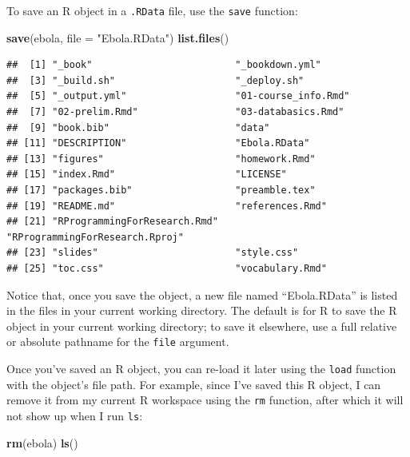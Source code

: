\documentclass[]{book}
\makeatletter
\newenvironment{Shaded}{\begin{snugshade}}{\end{snugshade}}
\newcommand{\KeywordTok}[1]{\textcolor[rgb]{0.13,0.29,0.53}{\textbf{#1}}}
\newcommand{\DataTypeTok}[1]{\textcolor[rgb]{0.13,0.29,0.53}{#1}}
\newcommand{\StringTok}[1]{\textcolor[rgb]{0.31,0.60,0.02}{#1}}
\newcommand{\NormalTok}[1]{#1}
\newenvironment{kframe}{%
\medskip{}
\setlength{\fboxsep}{.8em}
 \def\at@end@of@kframe{}%
 \ifinner\ifhmode%
  \def\at@end@of@kframe{\end{minipage}}%
  \begin{minipage}{\columnwidth}%
 \fi\fi%
 \def\FrameCommand##1{\hskip\@totalleftmargin \hskip-\fboxsep
 \colorbox{shadecolor}{##1}\hskip-\fboxsep
     \hskip-\linewidth \hskip-\@totalleftmargin \hskip\columnwidth}%
 \MakeFramed {\advance\hsize-\width
   \@totalleftmargin\z@ \linewidth\hsize
   \@setminipage}}%
 {\par\unskip\endMakeFramed%
 \at@end@of@kframe}
\renewenvironment{Shaded}{\begin{kframe}}{\end{kframe}}
\theoremstyle{definition}
\theoremstyle{definition}
\theoremstyle{definition}
\theoremstyle{remark}
\makeatother
\begin{document}
To save an R object in a \texttt{.RData} file, use the \texttt{save}
function:

\begin{Shaded}
\begin{Highlighting}[]
\KeywordTok{save}\NormalTok{(ebola, }\DataTypeTok{file =} \StringTok{"Ebola.RData"}\NormalTok{)}
\KeywordTok{list.files}\NormalTok{()}
\end{Highlighting}
\end{Shaded}

\begin{verbatim}
##  [1] "_book"                         "_bookdown.yml"                
##  [3] "_build.sh"                     "_deploy.sh"                   
##  [5] "_output.yml"                   "01-course_info.Rmd"           
##  [7] "02-prelim.Rmd"                 "03-databasics.Rmd"            
##  [9] "book.bib"                      "data"                         
## [11] "DESCRIPTION"                   "Ebola.RData"                  
## [13] "figures"                       "homework.Rmd"                 
## [15] "index.Rmd"                     "LICENSE"                      
## [17] "packages.bib"                  "preamble.tex"                 
## [19] "README.md"                     "references.Rmd"               
## [21] "RProgrammingForResearch.Rmd"   "RProgrammingForResearch.Rproj"
## [23] "slides"                        "style.css"                    
## [25] "toc.css"                       "vocabulary.Rmd"
\end{verbatim}

Notice that, once you save the object, a new file named ``Ebola.RData''
is listed in the files in your current working directory. The default is
for R to save the R object in your current working directory; to save it
elsewhere, use a full relative or absolute pathname for the
\texttt{file} argument.

Once you've saved an R object, you can re-load it later using the
\texttt{load} function with the object's file path. For example, since
I've saved this R object, I can remove it from my current R workspace
using the \texttt{rm} function, after which it will not show up when I
run \texttt{ls}:

\begin{Shaded}
\begin{Highlighting}[]
\KeywordTok{rm}\NormalTok{(ebola)}
\KeywordTok{ls}\NormalTok{()}
\end{Highlighting}
\end{Shaded}
\end{document}
